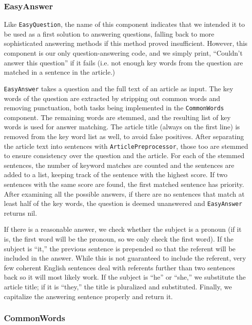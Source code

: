 \documentclass[11pt]{article}
\begin{document}
\subsubsection{EasyAnswer}

Like \texttt{EasyQuestion}, the name of this component indicates that we
intended it to be used as a first solution to answering questions, falling back
to more sophisticated answering methods if this method proved insufficient.
However, this component is our only question-answering code, and we simply
print, ``Couldn't answer this question'' if it fails (i.e. not enough key words
from the question are matched in a sentence in the article.)

\texttt{EasyAnswer} takes a question and the full text of an article as input.
The key words of the question are extracted by stripping out common words and
removing punctuation, both tasks being implemented in the \texttt{CommonWords}
component. The remaining words are stemmed, and the resulting list of key words
is used for answer matching. The article title (always on the first line) is
removed from the key word list as well, to avoid false positives. After
separating the article text into sentences with \texttt{ArticlePreprocessor},
those too are stemmed to ensure consistency over the question and the article.
For each of the stemmed sentences, the number of keyword matches are counted and
the sentences are added to a list, keeping track of the sentence with the
highest score. If two sentences with the same score are found, the first matched
sentence has priority. After examining all the possible answers, if there are no
sentences that match at least half of the key words, the question is deemed
unanswered and \texttt{EasyAnswer} returns nil.

If there is a reasonable answer, we check whether the subject is a pronoun (if
it is, the first word will be the pronoun, so we only check the first word). If
the subject is ``it,'' the previous sentence is prepended so that the referent
will be included in the answer. While this is not guaranteed to include the
referent, very few coherent English sentences deal with referents further than
two sentences back so it will most likely work. If the subject is ``he'' or
``she,'' we substitute the article title; if it is ``they,'' the title is
pluralized and substituted. Finally, we capitalize the answering sentence
properly and return it.

\subsubsection{CommonWords}
\end{document}

